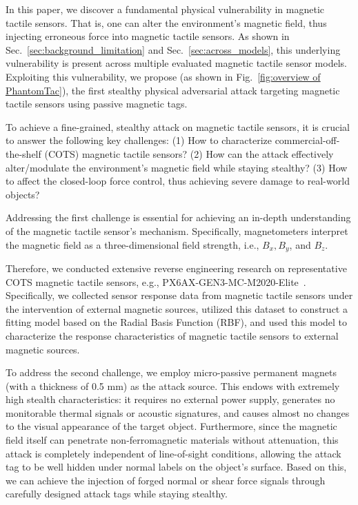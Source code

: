 In this paper, we discover a fundamental physical vulnerability in magnetic tactile sensors.
That is, one can alter the environment's magnetic field, thus injecting erroneous force into magnetic tactile sensors.
As shown in Sec.~\ref {sec:background_limitation} and Sec.~\ref {sec:across_models}, this underlying vulnerability is present across multiple evaluated magnetic tactile sensor models.
Exploiting this vulnerability, we propose {\name} (as shown in Fig.~\ref{fig:overview of PhantomTac}), the first stealthy physical adversarial attack targeting magnetic tactile sensors using passive magnetic tags.

To achieve a fine-grained, stealthy attack on magnetic tactile sensors, it is crucial to answer the following key challenges:
(1) How to characterize commercial-off-the-shelf (COTS) magnetic tactile sensors? 
(2) How can the attack effectively alter/modulate the environment's magnetic field while staying stealthy? 
(3) How to affect the closed-loop force control, thus achieving severe damage to real-world objects?

Addressing the first challenge is essential for achieving an in-depth understanding of the magnetic tactile sensor's mechanism.
Specifically, magnetometers interpret the magnetic field as a three-dimensional field strength, i.e., $B_x, B_y$, and $B_z$.

Therefore, we conducted extensive reverse engineering research on representative COTS magnetic tactile sensors, e.g., {PX6AX-GEN3-MC-M2020-Elite}~\cite{paxini2026px6axgen3}. 
Specifically, we collected sensor response data from magnetic tactile sensors under the intervention of external magnetic sources, utilized this dataset to construct a fitting model based on the Radial Basis Function (RBF), and used this model to characterize the response characteristics of magnetic tactile sensors to external magnetic sources.

To address the second challenge, we employ micro-passive permanent magnets (with a thickness of 0.5 mm) as the attack source. 
This endows {\name} with extremely high stealth characteristics: it requires no external power supply, generates no monitorable thermal signals or acoustic signatures, and causes almost no changes to the visual appearance of the target object. Furthermore, since the magnetic field itself can penetrate non-ferromagnetic materials without attenuation, this attack is completely independent of line-of-sight conditions, allowing the attack tag to be well hidden under normal labels on the object's surface. Based on this, we can achieve the injection of forged normal or shear force signals through carefully designed attack tags while staying stealthy.

